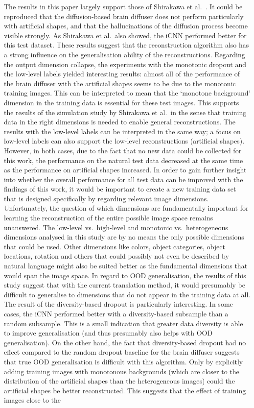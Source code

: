 The results in this paper largely support those of Shirakawa et al.~\cite{shirakawaSpuriousReconstructionBrain2024}. It could be reproduced that the diffusion-based brain diffuser does not perform particularly  with artificial shapes, and that the hallucinations of the diffusion process become visible strongly. As Shirakawa et al.\ also showed, the iCNN performed better for this test dataset. These results suggest that the reconstruction algorithm also has a strong influence on the generalisation ability of the reconstructions. Regarding the output dimension collapse, the experiments with the monotonic dropout and the low-level labels yielded interesting results: almost all of the performance of the brain diffuser with the artificial shapes seems to be due to the monotonic training images. This can be interpreted to mean that the `monotone background' dimension in the training data is essential for these test images. This supports the results of the simulation study by Shirakawa et al.\ in the sense that training data in the right dimensions is needed to enable general reconstructions. The results with the low-level labels can be interpreted in the same way; a focus on low-level labels can also support the low-level reconstructions (artificial shapes). However, in both cases, due to the fact that no new data could be collected for this work, the performance on the natural test data decreased at the same time as the performance on artificial shapes increased. In order to gain further insight into whether the overall performance for all test data can be improved with the findings of this work, it would be important to create a new training data set that is designed specifically by regarding relevant image dimensions. Unfortunately, the question of which dimensions are fundamentally important for learning the reconstruction of the entire possible image space remains unanswered. The low-level vs.\ high-level and monotonic vs.\ heterogeneous dimensions analysed in this study are by no means the only possible dimensions that could be used. Other dimensions like colors, object categories, object locations, rotation and others that could possibly not even be described by natural language might also be suited better as the fundamental dimensions that would span the image space. In regard to OOD generalisation, the results of this study suggest that with the current translation method, it would presumably be difficult to generalise to dimensions that do not appear in the training data at all. The result of the diversity-based dropout is particularly interesting. In some cases, the iCNN performed better with a diversity-based subsample than a random subsample. This is a small indication that greater data diversity is able to improve generalisation (and thus presumably also helps with OOD generalisation). On the other hand, the fact that diversity-based dropout had no effect compared to the random dropout baseline for the brain diffuser suggests that true OOD generalisation is difficult with this algorithm. Only by explicitly adding training images with monotonous backgrounds (which are closer to the distribution of the artificial shapes than the heterogeneous images) could the artificial shapes be better reconstructed. This suggests that the effect of training images close to the 